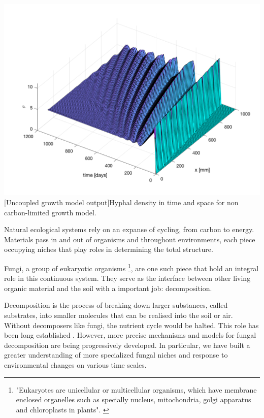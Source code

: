 \documentclass[12pt]{article}
\begin{document}
\begin{center}\label{Rho Growth 3D}
\includegraphics[width=\linewidth]{rho_growth_no_Cterm.png}
[Uncoupled growth model output]{Hyphal density in time and space for non carbon-limited growth model.}
\end{center}

\newpage
Natural ecological systems rely on an expanse of cycling, from carbon to energy. Materials pass in and out of organisms and throughout environments, each piece occupying niches that play roles in determining the total structure.

Fungi, a group of eukaryotic organisms \footnote{"Eukaryotes are unicellular or multicellular organisms, which have membrane enclosed organelles such as specially nucleus, mitochondria, golgi apparatus and chloroplasts in plants". \cite{Panawala2017}}, are one such piece that hold an integral role in this continuous system. They serve as the interface between other living organic material and the soil with a important job: decomposition.

Decomposition is the process of breaking down larger substances, called substrates, into smaller molecules that can be realised into the soil or air. Without decomposers like fungi, the nutrient cycle would be halted. This role has been long established \cite{Kakde2009}. However, more precise mechanisms and models for fungal decomposition are being progressively developed. In particular, we have built a greater understanding of more specialized fungal niches and response to environmental changes on various time scales.
\end{document}
